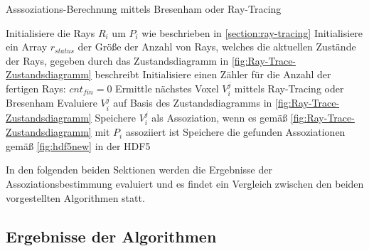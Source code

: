\begin{algorithm}[H]
\caption{Asssoziations-Berechnung mittels Bresenham oder Ray-Tracing} \label{pseudo:associations}
\begin{algorithmic}[1]
	\State Initialisiere die Rays $R_i$ um $P_{i}$ wie beschrieben in \ref{section:ray-tracing}
	\State Initialisiere ein Array $r_{status}$ der Größe der Anzahl von Rays, welches die aktuellen 				Zustände der Rays, gegeben durch das Zustandsdiagramm in \ref{fig:Ray-Trace-Zustandsdiagramm} beschreibt
	\State Initialisiere einen Zähler für die Anzahl der fertigen Rays: $cnt_{fin} = 0$
			\State Ermittle nächstes Voxel $V_i^j$ mittels Ray-Tracing oder Bresenham
			\State Evaluiere $V_i^j$ auf Basis des Zustandsdiagramms in \ref{fig:Ray-Trace-Zustandsdiagramm}
			\State Speichere $V_i^j$ als Assoziation, wenn es gemäß \ref{fig:Ray-Trace-Zustandsdiagramm} mit $P_i$ assoziiert ist
		\EndFor \label{Rays-Loop}
	\EndWhile
	\State Speichere die gefunden Assoziationen gemäß \ref{fig:hdf5new} in der HDF5
\EndProcedure
\end{algorithmic}
\end{algorithm}

In den folgenden beiden Sektionen werden die Ergebnisse der Assoziationsbestimmung evaluiert und es findet ein Vergleich zwischen den beiden vorgestellten Algorithmen statt.

\subsection{Ergebnisse der Algorithmen}
\label{section:association_results}

